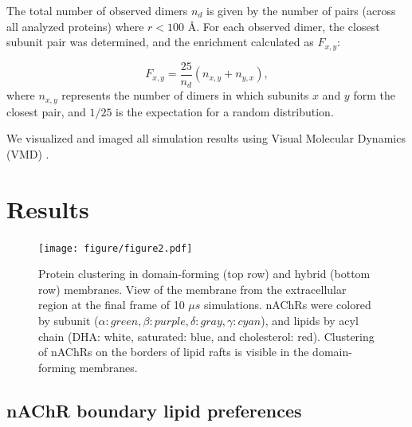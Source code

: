 The total number of observed dimers $n_{d}$ is given by the number of pairs (across all analyzed proteins) where $r<100$ {\AA}. For each observed dimer, the closest subunit pair was determined, and the enrichment calculated as $F_{x,y}$:


  

\begin{equation}\label{eq:subunit}
F_{x,y} = \frac{{25}}{n_{d}}\left({n_{x,y}}+ n_{y,x}\right),
\end{equation}
where $n_{x,y}$ represents the number of dimers in which subunits $x$ and $y$ form the closest pair, and $1/25$ is the expectation for a random distribution.%

We visualized and imaged all simulation results using Visual Molecular Dynamics (VMD) \citep{HUMP96}. 
\section{Results}
\begin{figure}[h]
\center
\texttt{[image: figure/figure2.pdf]}
	\begin{flushleft}
\caption[Protein clustering in domain-forming (top row) and hybrid (bottom row) membranes.] {Protein clustering in domain-forming (top row) and hybrid (bottom row) membranes. View of the membrane from the extracellular region at the final frame of 10 $\mu s$ simulations. nAChRs were colored by subunit ($\alpha:green,\beta:purple,\delta:gray,\gamma:cyan$), and lipids by acyl chain (DHA: white, saturated: blue, and cholesterol: red). Clustering of nAChRs on the borders of lipid rafts is visible in the domain-forming membranes.}
	\end{flushleft}

\label{fig:Figure4}
\end{figure}

\subsection{nAChR boundary lipid preferences}\label{sec:lipids}

